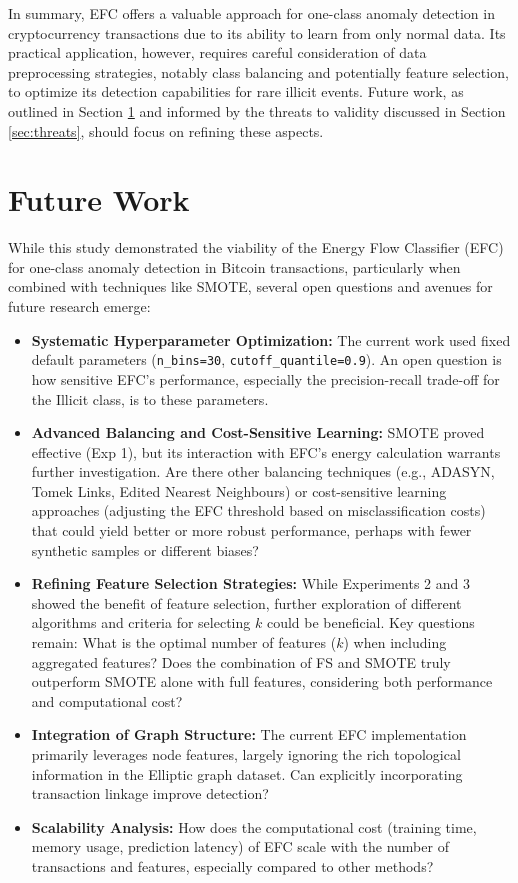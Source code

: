 \documentclass[12pt]{article}
\begin{document}
In summary, EFC offers a valuable approach for one-class anomaly detection in cryptocurrency transactions due to its ability
to learn from only normal data. Its practical application, however, requires careful consideration of data preprocessing
strategies, notably class balancing and potentially feature selection, to optimize its detection capabilities for rare illicit
events. Future work, as outlined in Section \ref{sec:future_work} and informed by the threats to validity discussed in Section
\ref{sec:threats}, should focus on refining these aspects.

\section{Future Work} \label{sec:future_work}

While this study demonstrated the viability of the Energy Flow Classifier (EFC) for one-class anomaly detection in Bitcoin
transactions, particularly when combined with techniques like SMOTE, several open questions and avenues for future research emerge:

\begin{itemize}
    \item \textbf{Systematic Hyperparameter Optimization:} The current work used fixed default parameters (\texttt{n\_bins=30},
    \texttt{cutoff\_quantile=0.9}). An open question is how sensitive EFC's performance, especially the precision-recall
    trade-off for the Illicit class, is to these parameters.

    \item \textbf{Advanced Balancing and Cost-Sensitive Learning:} SMOTE proved effective (Exp 1), but its interaction with
    EFC's energy calculation warrants further investigation. Are there other balancing techniques (e.g., ADASYN, Tomek Links,
    Edited Nearest Neighbours) or cost-sensitive learning approaches (adjusting the EFC threshold based on misclassification
    costs) that could yield better or more robust performance, perhaps with fewer synthetic samples or different biases?
    \item \textbf{Refining Feature Selection Strategies:} While Experiments 2 and 3 showed the benefit of feature selection,
    further exploration of different algorithms and criteria for selecting $k$ could be beneficial. Key questions remain: What
    is the optimal number of features ($k$) when including aggregated features? Does the combination of FS and SMOTE truly
    outperform SMOTE alone with full features, considering both performance and computational cost?

    \item \textbf{Integration of Graph Structure:} The current EFC implementation primarily leverages node features,
    largely ignoring the rich topological information in the Elliptic graph dataset. Can explicitly incorporating transaction
    linkage improve detection?

    \item \textbf{Scalability Analysis:} How does the computational cost (training time, memory usage, prediction latency)
    of EFC scale with the number of transactions and features, especially compared to other methods?
\end{itemize}
\end{document}
